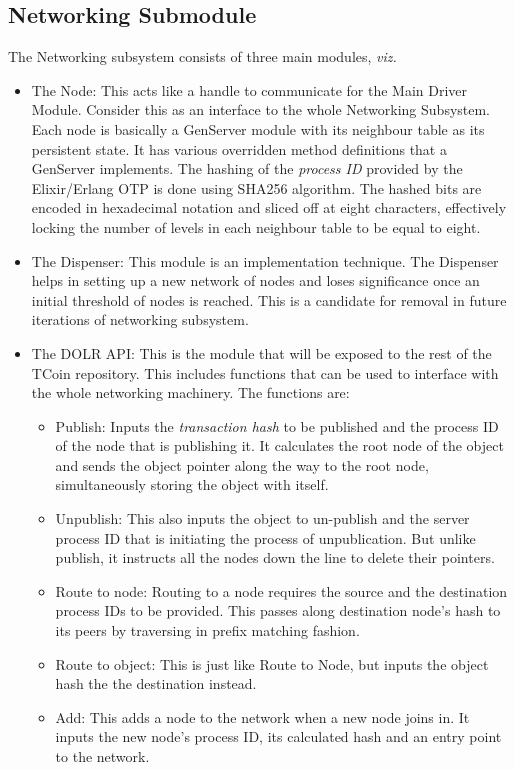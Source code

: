 \documentclass[conference,a4paper,12pt]{IEEEtran}
\begin{document}
	\subsection{Networking Submodule}
	The Networking subsystem consists of three main modules, \textit{viz.}
	\begin{itemize}
	\item{The Node: }
	This acts like a handle to communicate for the Main Driver Module. Consider this as an interface to the whole Networking Subsystem. Each node is basically a GenServer module with its neighbour table as its persistent state. It has various overridden method definitions that a GenServer implements. The hashing of the \textit{process ID} provided by the Elixir/Erlang OTP is done using SHA256 algorithm. The hashed bits are encoded in hexadecimal notation and sliced off at eight characters, effectively locking the number of levels in each neighbour table to be equal to eight.
	\item{The Dispenser: }
	This module is an implementation technique. The Dispenser helps in setting up a new network of nodes and loses significance once an initial threshold of nodes is reached. This is a candidate for removal in future iterations of networking subsystem.
	\item{The DOLR API: }
	This is the module that will be exposed to the rest of the TCoin repository. This includes functions that can be used to interface with the whole networking machinery. The functions are:
		\begin{itemize}
			\item{Publish: }
			Inputs the \textit{transaction hash} to be published and the process ID of the node that is publishing it. It calculates the root node of the object and sends the object pointer along the way to the root node, simultaneously storing the object with itself.
			\item{Unpublish: }
			This also inputs the object to un-publish and the server process ID that is initiating the process of unpublication. But unlike publish, it instructs all the nodes down the line to delete their pointers.
			\item{Route to node: }
			Routing to a node requires the source and the destination process IDs to be provided. This passes along destination node's hash to its peers by traversing in prefix matching fashion.
			\item{Route to object: }
			This is just like Route to Node, but inputs the object hash the the destination instead.
			\item{Add: }
			This adds a node to the network when a new node joins in. It inputs the new node's process ID, its calculated hash and an entry point to the network.
		\end{itemize}
	\end{itemize}
\end{document}
